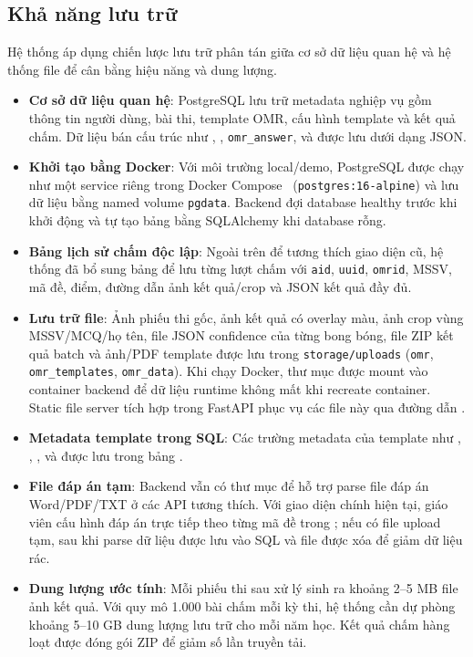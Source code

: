 \subsection{Khả năng lưu trữ}
Hệ thống áp dụng chiến lược lưu trữ phân tán giữa cơ sở dữ liệu quan hệ và hệ thống file để cân bằng hiệu năng và dung lượng.

\begin{itemize}[leftmargin=1.5cm]
  \item \textbf{Cơ sở dữ liệu quan hệ}: PostgreSQL lưu trữ metadata nghiệp vụ gồm thông tin người dùng, bài thi, template OMR, cấu hình template và kết quả chấm. Dữ liệu bán cấu trúc như , , \texttt{omr\_answer},  và  được lưu dưới dạng JSON.
  \item \textbf{Khởi tạo bằng Docker}: Với môi trường local/demo, PostgreSQL được chạy như một service riêng trong Docker Compose~\cite{docker} (\texttt{postgres:16-alpine}) và lưu dữ liệu bằng named volume \texttt{pgdata}. Backend đợi database healthy trước khi khởi động và tự tạo bảng bằng SQLAlchemy khi database rỗng.
  \item \textbf{Bảng lịch sử chấm độc lập}: Ngoài  trên  để tương thích giao diện cũ, hệ thống đã bổ sung bảng  để lưu từng lượt chấm với \texttt{aid}, \texttt{uuid}, \texttt{omrid}, MSSV, mã đề, điểm, đường dẫn ảnh kết quả/crop và JSON kết quả đầy đủ.
  \item \textbf{Lưu trữ file}: Ảnh phiếu thi gốc, ảnh kết quả có overlay màu, ảnh crop vùng MSSV/MCQ/họ tên, file JSON confidence của từng bong bóng, file ZIP kết quả batch và ảnh/PDF template được lưu trong \texttt{storage/uploads} (\texttt{omr}, \texttt{omr\_templates}, \texttt{omr\_data}). Khi chạy Docker, thư mục  được mount vào container backend để dữ liệu runtime không mất khi recreate container. Static file server tích hợp trong FastAPI phục vụ các file này qua đường dẫn .
  \item \textbf{Metadata template trong SQL}: Các trường metadata của template như , , ,  và  được lưu trong bảng .
  \item \textbf{File đáp án tạm}: Backend vẫn có thư mục  để hỗ trợ parse file đáp án Word/PDF/TXT ở các API tương thích. Với giao diện chính hiện tại, giáo viên cấu hình đáp án trực tiếp theo từng mã đề trong ; nếu có file upload tạm, sau khi parse dữ liệu được lưu vào SQL và file được xóa để giảm dữ liệu rác.
  \item \textbf{Dung lượng ước tính}: Mỗi phiếu thi sau xử lý sinh ra khoảng 2--5 MB file ảnh kết quả. Với quy mô 1.000 bài chấm mỗi kỳ thi, hệ thống cần dự phòng khoảng 5--10 GB dung lượng lưu trữ cho mỗi năm học. Kết quả chấm hàng loạt được đóng gói ZIP để giảm số lần truyền tải.
\end{itemize}

